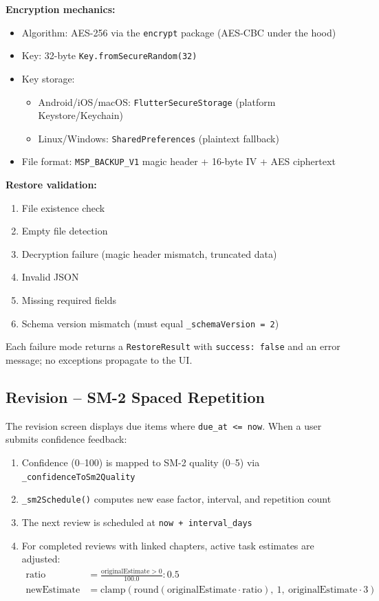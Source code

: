 \documentclass[12pt,a4paper,openany]{report}
\begin{document}
\textbf{Encryption mechanics:}
\begin{itemize}[leftmargin=*]
  \item Algorithm: AES-256 via the \texttt{encrypt} package (AES-CBC under the hood)
  \item Key: 32-byte \texttt{Key.fromSecureRandom(32)}
  \item Key storage:
  \begin{itemize}[leftmargin=*]
    \item Android/iOS/macOS: \texttt{FlutterSecureStorage} (platform Keystore/Keychain)
    \item Linux/Windows: \texttt{SharedPreferences} (plaintext fallback)
  \end{itemize}
  \item File format: \texttt{MSP\_BACKUP\_V1} magic header + 16-byte IV + AES ciphertext
\end{itemize}

\textbf{Restore validation:}
\begin{enumerate}[leftmargin=*]
  \item File existence check
  \item Empty file detection
  \item Decryption failure (magic header mismatch, truncated data)
  \item Invalid JSON
  \item Missing required fields
  \item Schema version mismatch (must equal \texttt{\_schemaVersion = 2})
\end{enumerate}

Each failure mode returns a \texttt{RestoreResult} with \texttt{success: false} and an error message; no exceptions propagate to the UI.

\subsection{Revision -- SM-2 Spaced Repetition}

The revision screen displays due items where \texttt{due\_at <= now}. When a user submits confidence feedback:

\begin{enumerate}[leftmargin=*]
  \item Confidence (0--100) is mapped to SM-2 quality (0--5) via \texttt{\_confidenceToSm2Quality}
  \item \texttt{\_sm2Schedule()} computes new ease factor, interval, and repetition count
  \item The next review is scheduled at \texttt{now + interval\_days}
  \item For completed reviews with linked chapters, active task estimates are adjusted:
  \begin{align}
  \text{ratio} &= \frac{\text{originalEstimate} > 0}{100.0} : 0.5 \\
  \text{newEstimate} &= \text{clamp}(\text{round}(\text{originalEstimate} \cdot \text{ratio}),\ 1,\ \text{originalEstimate} \cdot 3)
  \end{align}
\end{enumerate}
\end{document}
